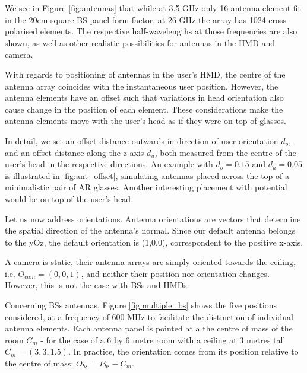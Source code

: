 
We see in Figure \ref{fig:antennas} that while at 3.5 GHz only 16 antenna element fit in the 20cm square \ac{BS} panel form factor, at 26 GHz the array has 1024 cross-polarised elements. The respective half-wavelengths at those frequencies are also shown, as well as other realistic possibilities for antennas in the \ac{HMD} and camera.

With regards to positioning of antennas in the user's \ac{HMD}, the centre of the antenna array coincides with the instantaneous user position. However, the antenna elements have an offset such that variations in head orientation also cause change in the position of each element. These considerations make the antenna elements move with the user's head as if they were on top of glasses.

In detail, we set an offset distance outwards in direction of user orientation $d_{o}$, and an offset distance along the z-axis $d_{u}$, both measured from the centre of the user's head in the respective directions. An example with $d_{o} = 0.15$ and $d_{u} = 0.05$ is illustrated in \ref{fig:ant_offset}, simulating antennas placed across the top of a minimalistic pair of \ac{AR} glasses. Another interesting placement with potential would be on top of the user's head.


Let us now address orientations. Antenna orientations are vectors that determine the spatial direction of the antenna's normal. Since our default antenna belongs to the yOz, the default orientation is (1,0,0), correspondent to the positive x-axis. 

A camera is static, their antenna arrays are simply oriented towards the ceiling, i.e. $O_{cam} = (0,0,1)$, and neither their position nor orientation changes. However, this is not the case with \acp{BS} and \acp{HMD}. 

Concerning \acsp{BS} antennas, Figure \ref{fig:multiple_bs} shows the five positions considered, at a frequency of 600 MHz to facilitate the distinction of individual antenna elements. Each antenna panel is pointed at a the centre of mass of the room $C_m$ - for the case of a 6 by 6 metre room with a ceiling at 3 metres tall $C_m = (3, 3, 1.5)$. In practice, the orientation comes from its position relative to the centre of mass: $O_{bs} = P_{bs} - C_m$.

